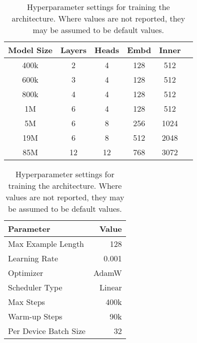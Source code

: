 \begin{table}[t]
    \begin{minipage}{.5\linewidth}
        \centering
        \small
        \begin{tabular}{cccccc}
            \toprule
            Model Size & Layers & Heads & Embd & Inner \\
            \midrule
            400k & 2 & 4 & 128 & 512 \\ 
            600k & 3 & 4 & 128 & 512 \\ 
            800k & 4 & 4 & 128 & 512 \\ 
            1M & 6 & 4 & 128 & 512 \\ 
            5M & 6 & 8 & 256 & 1024 \\ 
            19M & 6 & 8 & 512 & 2048 \\ 
            85M & 12 & 12 & 768 & 3072 \\ 
            \bottomrule
        \end{tabular}
        \caption{Parameters for \gpt model of varying sizes. Where values are not reported, they may be assumed to be default values.}
        \label{tab:14-model_sizes}
    \end{minipage}
    \hfill
    \begin{minipage}{.5\linewidth}
        \centering
        \small
        \begin{tabular}{lr}
            \toprule
            Parameter & Value \\
            \midrule
            Max Example Length & 128 \\
            Learning Rate & 0.001\\
            Optimizer & AdamW \\
            Scheduler Type & Linear\\
            Max Steps & 400k \\
            Warm-up Steps & 90k \\
            Per Device Batch Size & 32 \\
            \bottomrule
        \end{tabular}
        \caption{Hyperparameter settings for training the \gpt architecture. Where values are not reported, they may be assumed to be default values.}
        \label{tab:14-trainingparams}
    \end{minipage}
\end{table}

